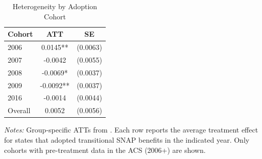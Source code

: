 
\begin{table}[H]
\centering
\caption{Heterogeneity by Adoption Cohort}
\label{tab:heterogeneity}
\begin{threeparttable}
\begin{tabular}{lcc}
\toprule
Cohort & ATT & SE \\
\midrule
  2006 & 0.0145** & (0.0063) \\
  2007 & -0.0042 & (0.0055) \\
  2008 & -0.0069* & (0.0037) \\
  2009 & -0.0092** & (0.0037) \\
  2016 & -0.0014 & (0.0044) \\
\midrule
Overall & 0.0052 & (0.0056) \\
\bottomrule
\end{tabular}
\begin{tablenotes}[flushleft]
\small
\item \textit{Notes:} Group-specific ATTs from \citet{callaway2021difference}. Each row reports the average treatment effect for states that adopted transitional SNAP benefits in the indicated year. Only cohorts with pre-treatment data in the ACS (2006+) are shown.
\end{tablenotes}
\end{threeparttable}
\end{table}
